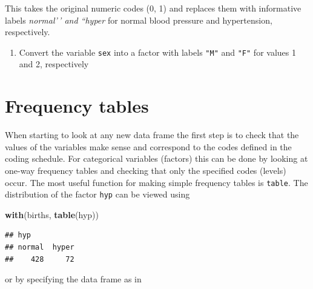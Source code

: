 \documentclass[
]{book}
\newenvironment{Shaded}{\begin{snugshade}}{\end{snugshade}}
\newcommand{\AttributeTok}[1]{\textcolor[rgb]{0.13,0.29,0.53}{#1}}
\newcommand{\FunctionTok}[1]{\textcolor[rgb]{0.13,0.29,0.53}{\textbf{#1}}}
\newcommand{\NormalTok}[1]{#1}
\newcommand{\OtherTok}[1]{\textcolor[rgb]{0.56,0.35,0.01}{#1}}
\newcommand{\SpecialCharTok}[1]{\textcolor[rgb]{0.81,0.36,0.00}{\textbf{#1}}}
\newcommand{\StringTok}[1]{\textcolor[rgb]{0.31,0.60,0.02}{#1}}
\providecommand{\tightlist}{%
  \setlength{\itemsep}{0pt}\setlength{\parskip}{0pt}}
\theoremstyle{definition}
\theoremstyle{definition}
\theoremstyle{definition}
\theoremstyle{definition}
\theoremstyle{remark}
\begin{document}
\begin{Shaded}
\end{Shaded}

This takes the original numeric codes (0, 1) and replaces them with
informative labels \emph{normal'\,' and ``hyper} for normal blood pressure
and hypertension, respectively.

\begin{enumerate}
\def\labelenumi{\arabic{enumi}.}
\tightlist
\item
  Convert the variable \texttt{sex} into a factor
  with labels \texttt{"M"} and \texttt{"F"} for values 1 and 2, respectively
\end{enumerate}

\section{Frequency tables}\label{frequency-tables}

When starting to look at any new data frame the first step is to check
that the values of the variables make sense and correspond to the
codes defined in the coding schedule. For categorical variables
(factors) this can be done by looking at one-way frequency tables and
checking that only the specified codes (levels) occur. The most
useful function for making simple frequency tables is \texttt{table}.
The distribution of the factor \texttt{hyp} can be viewed using

\begin{Shaded}
\begin{Highlighting}[]
\FunctionTok{with}\NormalTok{(births, }\FunctionTok{table}\NormalTok{(hyp))}
\end{Highlighting}
\end{Shaded}

\begin{verbatim}
## hyp
## normal  hyper 
##    428     72
\end{verbatim}

or by specifying the data frame as in

\begin{Shaded}
\end{Shaded}
\end{document}
